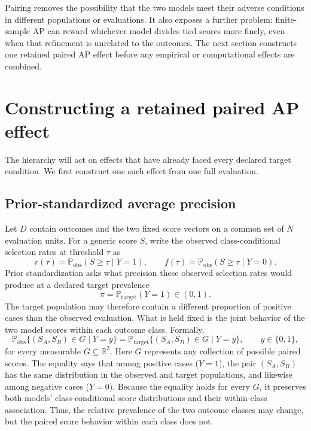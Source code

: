 \documentclass[11pt]{article}
\newcommand{\Prb}{\mathbb{P}}
\theoremstyle{remark}
\begin{document}
Pairing removes the possibility that the two models meet their adverse
conditions in different populations or evaluations. It also exposes a further
problem: finite-sample AP can reward whichever model divides tied scores more
finely, even when that refinement is unrelated to the outcomes. The next
section constructs one retained paired AP effect before any empirical or
computational effects are combined.


\section{Constructing a retained paired AP effect}
\label{sec:paired-effect}

The hierarchy will act on effects that have already faced every declared target
condition. We first construct one such effect from one full evaluation.

\subsection{Prior-standardized average precision}

Let $D$ contain outcomes and the two fixed score vectors on a common set of
$N$ evaluation units. For a generic score $S$, write the observed
class-conditional selection rates at threshold $\tau$ as
\[
r(\tau)=\Prb_{\mathrm{obs}}(S\geq\tau\mid Y=1),
\qquad
f(\tau)=\Prb_{\mathrm{obs}}(S\geq\tau\mid Y=0).
\]
Prior standardization asks what precision these observed selection rates would
produce at a declared target prevalence
\[
\pi=\Prb_{\mathrm{target}}(Y=1)\in(0,1).
\]
The target population may therefore contain a different proportion of positive
cases than the observed evaluation. What is held fixed is the joint behavior
of the two model scores within each outcome class. Formally,
\begin{equation}
\Prb_{\mathrm{obs}}\{(S_A,S_B)\in G\mid Y=y\}
=
\Prb_{\mathrm{target}}\{(S_A,S_B)\in G\mid Y=y\},
\qquad y\in\{0,1\},
\label{eq:score-invariance}
\end{equation}
for every measurable $G\subseteq\mathbb R^2$. Here $G$ represents any
collection of possible paired scores. The equality says that among positive
cases ($Y=1$), the pair $(S_A,S_B)$ has the same distribution in the observed
and target populations, and likewise among negative cases ($Y=0$). Because the
equality holds for every $G$, it preserves both models' class-conditional score
distributions and their within-class association. Thus, the relative
prevalence of the two outcome classes may change, but the paired score behavior
within each class does not.
\end{document}
